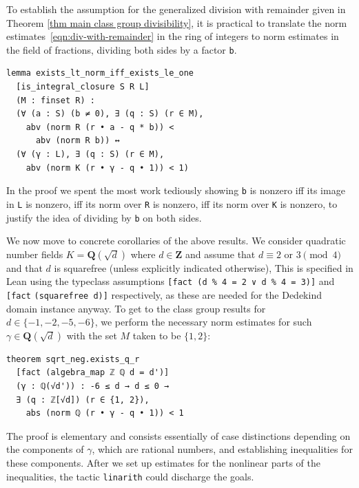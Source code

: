 \documentclass[sigplan,10pt,nonacm,
screen]{acmart} \settopmatter{printfolios=true,printccs=false,printacmref=false}
\newcommand{\QQ}{\mathbf{Q}}
\newcommand{\ZZ}{\mathbf{Z}}
\begin{document}
To establish the assumption for the generalized division with remainder given in Theorem \ref{thm main class group divisibility},
it is practical to translate the norm estimates~\eqref{eqn:div-with-remainder} in the ring of integers to norm estimates in the field of fractions, dividing both sides by a factor \lstinline{b}.
\begin{lstlisting}
lemma exists_lt_norm_iff_exists_le_one
  [is_integral_closure S R L]
  (M : finset R) :
  (∀ (a : S) (b ≠ 0), ∃ (q : S) (r ∈ M),
    abv (norm R (r • a - q * b)) <
      abv (norm R b)) ↔
  (∀ (γ : L), ∃ (q : S) (r ∈ M),
    abv (norm K (r • γ - q • 1)) < 1)
\end{lstlisting}
In the proof we spent the most work tediously showing \lstinline{b} is nonzero iff its image in \lstinline{L} is nonzero, iff its norm over \lstinline{R} is nonzero, iff its norm over \lstinline{K} is nonzero,
to justify the idea of dividing by \lstinline{b} on both sides.

We now move to concrete corollaries of the above results.
We consider quadratic number fields $K=\QQ(\sqrt{d})$ where $d \in \ZZ$ and assume that $d\equiv 2 \text{ or } 3 \pmod{4}$ and that $d$ is squarefree (unless explicitly indicated otherwise),
This is specified in Lean using the typeclass assumptions \lstinline{[fact (d % 4 = 2 ∨ d % 4 = 3)]} and \lstinline{[fact} \lstinline{(square}\-\lstinline{free d)]} respectively, as these are needed for the Dedekind domain instance anyway.
To get to the class group results for $d \in \{-1,-2,-5,-6 \}$, we perform the necessary norm estimates for such $\gamma \in \QQ(\sqrt{d})$ with the set $M$ taken to be $\{1,2\}$:

\begin{lstlisting}
theorem sqrt_neg.exists_q_r
  [fact (algebra_map ℤ ℚ d = d')]
  (γ : ℚ(√d')) : -6 ≤ d → d ≤ 0 →
  ∃ (q : ℤ[√d]) (r ∈ {1, 2}),
    abs (norm ℚ (r • γ - q • 1)) < 1
\end{lstlisting}

The proof is elementary and consists essentially of case distinctions depending on the components of $\gamma$, which are rational numbers, and establishing inequalities for these components.
After we set up estimates for the nonlinear parts of the inequalities,
the tactic \lstinline{linarith} could discharge the goals.
\end{document}
